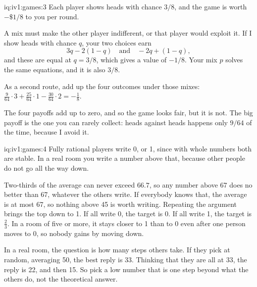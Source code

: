\begin{solution}{iq:iv1:games:3}
Each player shows heads with chance $3/8$, and the game is worth $-\$1/8$ to you per round.

A mix must make the other player indifferent, or that player would exploit it. If I show heads with chance $q$, your two choices earn
\[
3q - 2(1 - q) \quad\text{and}\quad -2q + (1 - q),
\]
and these are equal at $q = 3/8$, which gives a value of $-1/8$. Your mix $p$ solves the same equations, and it is also $3/8$.

As a second route, add up the four outcomes under those mixes: $\tfrac{9}{64} \cdot 3 + \tfrac{25}{64} \cdot 1 - \tfrac{30}{64} \cdot 2 = -\tfrac18$.

The four payoffs add up to zero, and so the game looks fair, but it is not. The big payoff is the one you can rarely collect: heads against heads happens only $9/64$ of the time, because I avoid it.

\end{solution}

\begin{solution}{iq:iv1:games:4}
Fully rational players write 0, or 1, since with whole numbers both are stable. In a real room you write a number above that, because other people do not go all the way down.

Two-thirds of the average can never exceed $66.7$, so any number above 67 does no better than 67, whatever the others write. If everybody knows that, the average is at most 67, so nothing above 45 is worth writing. Repeating the argument brings the top down to 1. If all write 0, the target is 0. If all write 1, the target is $\tfrac23$. In a room of five or more, it stays closer to 1 than to 0 even after one person moves to 0, so nobody gains by moving down.

In a real room, the question is how many steps others take. If they pick at random, averaging 50, the best reply is 33. Thinking that they are all at 33, the reply is 22, and then 15. So pick a low number that is one step beyond what the others do, not the theoretical answer.

\end{solution}

